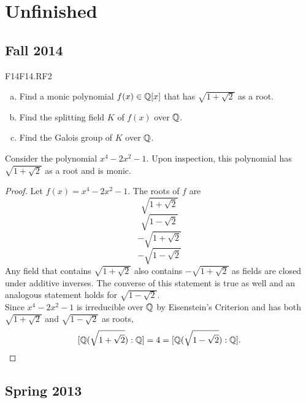 \documentclass[../AlgebraQualSolutions.tex]{subfiles}
\begin{document}
\section{Unfinished}

\subsection{Fall 2014}


\begin{prob}{F14}{F14.RF2}
	\begin{enumerate}[(a)]
		\item Find a monic polynomial $f(x) \in \mathbb{Q}[x]$ that has $\sqrt{1 + \sqrt2}$ as a root.
		\item Find the splitting field $K$ of $f(x)$ over $\mathbb{Q}$.
		\item Find the Galois group of $K$ over $\mathbb{Q}$.
	\end{enumerate}
\end{prob}

\begin{solution}
	Consider the polynomial $x^4 - 2x^2 - 1$. Upon inspection, this polynomial has $\sqrt{1 + \sqrt2}$ as a root and is monic.
\end{solution}

\begin{proof}
	Let $f(x) = x^4 - 2x^2 - 1$. The roots of $f$ are
		\[\sqrt{1 + \sqrt2}\]
		\[\sqrt{1 - \sqrt2}\]
		\[-\sqrt{1 + \sqrt2}\]
		\[-\sqrt{1 - \sqrt2}\]
	Any field that contains $\sqrt{1 + \sqrt2}$ also contains $-\sqrt{1 + \sqrt2}$ as fields are closed under additive inverses. The converse of this statement is true as well and an analogous statement holds for $\sqrt{1 - \sqrt2}$.\\

	Since $x^4 - 2x^2 - 1$ is irreducible over $\mathbb{Q}$ by Eisenstein's Criterion and has both $\sqrt{1 + \sqrt2}$ and $\sqrt{1 - \sqrt2}$ as roots,
		\[ [\mathbb{Q}(\sqrt{1 + \sqrt2}): \mathbb{Q}] = 4 = [\mathbb{Q}(\sqrt{1 - \sqrt2}): \mathbb{Q}]. \]
\end{proof}


\subsection{Spring 2013}
\end{document}

